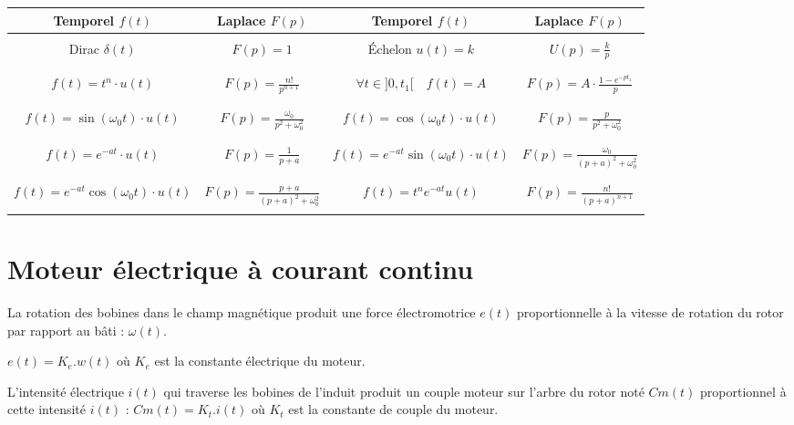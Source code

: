 \begin{center}
\begin{tabular}{|c|c||c|c|}
\hline
Temporel $f(t)$ & Laplace $F(p)$ & 
Temporel $f(t)$ & Laplace $F(p)$ \\
\hline
\hline
 &&& \\
Dirac $\delta(t)$ &
$F(p)=1$ &
Échelon $ u(t)=k $&
$ U(p) = \frac{k}{p}$
\\
&&& \\
\hline
&&& \\
$f(t) = t^n\cdot u(t)$ &
$F(p)=\frac{n!}{p^{n+1}} $ &
$\forall t\in ]0,t_1 [ \quad f(t)= A$ & 
$F(p) =A \cdot \frac{1-e^{-pt_1}}{p} $\\
&&& \\
\hline
&&& \\
$f(t) = \sin \left( \omega_0 t\right) \cdot u(t)$ &
$F(p) = \frac{\omega_0}{p^2+\omega_0^2} $ &
$f(t) = \cos \left( \omega_0 t\right) \cdot u(t)$ & 
$F(p) = \frac{p}{p^2+\omega_0^2} $ \\
&&& \\
\hline
&&& \\
$f(t)= e^{-at}\cdot u(t)$ & 
$F(p)= \frac{1}{p+a}$ &
$f(t) = e^{-at}\sin\left( \omega_0 t\right) \cdot u(t)$ &
$F(p)=\frac{\omega_0}{\left( p+a\right)^2 + \omega_0^2}$  \\
&&& \\
\hline
&&& \\
$f(t) = e^{-at}\cos\left( \omega_0 t\right) \cdot u(t)$ &
$F(p)=\frac{p+a}{\left( p+a\right)^2 + \omega_0^2}$  &
$f(t)=t^ne^{-at}u(t)$ & $F(p)=\frac{n!}{\left( p+a\right)^{n+1}}$ \\
&&& \\
\hline
\end{tabular}
\end{center}

\newpage

\section{Moteur électrique à courant continu}

La rotation des bobines dans le champ magnétique produit une force électromotrice $e(t)$ proportionnelle à la vitesse de rotation du rotor par rapport au bâti : $\omega(t)$.

$e(t)=K_e.w(t)$ où $K_e$ est la constante électrique du moteur.

L'intensité électrique $i(t)$ qui traverse les bobines de l'induit produit un couple moteur sur l'arbre du rotor noté $Cm(t)$ proportionnel à cette intensité $i(t)$ : $Cm(t)=K_t.i(t)$ où $K_t$ est la constante de 
couple du moteur. 

